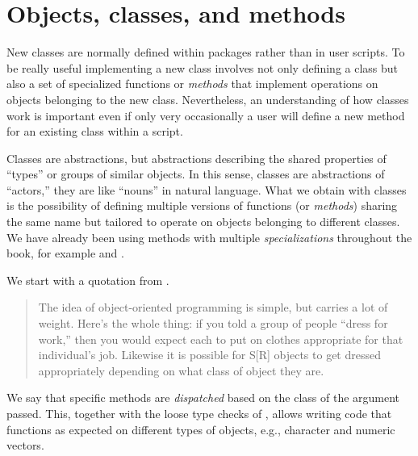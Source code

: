 \documentclass[krantz2]{krantz}\usepackage{knitr}
\begin{document}
\section{Objects, classes, and methods}\label{sec:script:objects:classes:methods}\label{sec:methods}
New classes are normally defined within packages rather than in user scripts. To be really useful implementing a new class involves not only defining a class but also a set of specialized functions or \emph{methods} that implement operations on objects belonging to the new class. Nevertheless, an understanding of how classes work is important even if only very occasionally a user will define a new method for an existing class within a script.

Classes are abstractions, but abstractions describing the shared properties of ``types'' or groups of similar objects. In this sense, classes are abstractions of ``actors,'' they are like ``nouns'' in natural language. What we obtain with classes is the possibility of defining multiple versions of functions (or \emph{methods}) sharing the same name but tailored to operate on objects belonging to different classes. We have already been using methods with multiple \emph{specializations} throughout the book, for example  and .

We start with a quotation from  \autocite[][, page 13]{Burns1998}.
\begin{quotation}
The idea of object-oriented programming is simple, but carries a lot of weight.
Here's the whole thing: if you told a group of people ``dress for work,'' then
you would expect each to put on clothes appropriate for that individual's job.
Likewise it is possible for S[R] objects to get dressed appropriately depending on
what class of object they are.
\end{quotation}

We say that specific methods are \emph{dispatched} based on the class of the argument passed. This, together with the loose type checks of \Rlang, allows writing code that functions as expected on different types of objects, e.g., character and numeric vectors.
\end{document}

